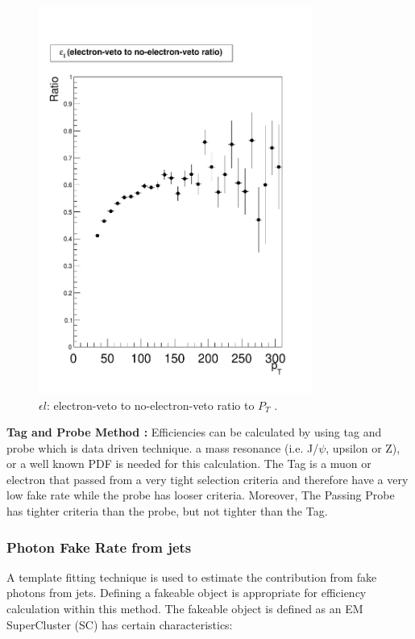 \documentclass[12pt,oneandhalf,chaparabic,phys,ms,eng]{metu}
\begin{document}
\begin{figure}[!hbt]
\centering
    \includegraphics[width=0.8\textwidth]{FakeRateRatio_PT}
    \caption{\label{FPT} $\epsilon l$: electron-veto to no-electron-veto ratio to $P_T$ .}
\end{figure}

\textbf{Tag and Probe Method \cite{R23}:}  
Efficiencies can be calculated by using tag and probe which is data driven technique. a mass resonance (i.e. J/$\psi$, upsilon or Z), or a well known PDF is needed for this calculation. The Tag is a muon or electron that passed from a very tight selection criteria and therefore have a very low fake rate while the probe has looser criteria. Moreover, The Passing Probe has tighter criteria than the probe, but not tighter than the Tag.


\subsubsection{Photon Fake Rate from jets}

A template fitting technique is used to estimate  the contribution from fake photons from jets.
Defining a fakeable object is appropriate for  efficiency calculation within this method. The fakeable object is defined as an EM SuperCluster (SC) has certain characteristics:
\end{document}
